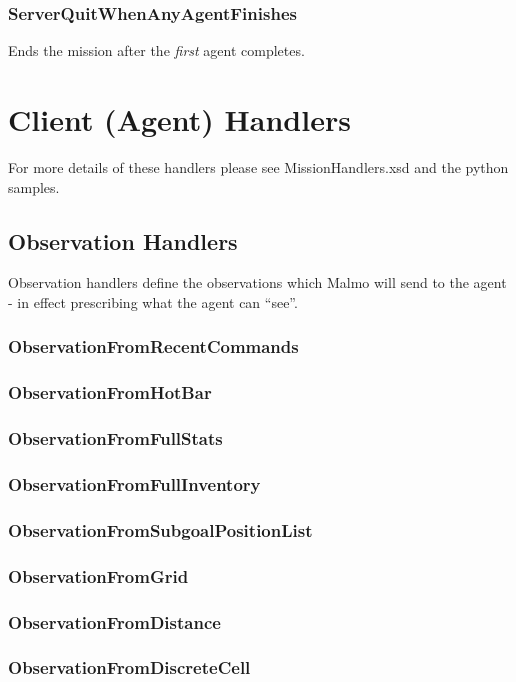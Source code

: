 \documentclass[11pt]{article} %
\begin{document}
\subsubsection{ServerQuitWhenAnyAgentFinishes}
Ends the mission after the \emph{first} agent completes.

\section{Client (Agent) Handlers}
For more details of these handlers please see MissionHandlers.xsd and the python samples.

\subsection{Observation Handlers}
Observation handlers define the observations which Malmo will send to the agent - in effect prescribing what the agent can ``see''.

\subsubsection{ObservationFromRecentCommands}
\subsubsection{ObservationFromHotBar}
\subsubsection{ObservationFromFullStats}
\subsubsection{ObservationFromFullInventory}
\subsubsection{ObservationFromSubgoalPositionList}
\subsubsection{ObservationFromGrid}
\subsubsection{ObservationFromDistance}
\subsubsection{ObservationFromDiscreteCell}
\end{document}
